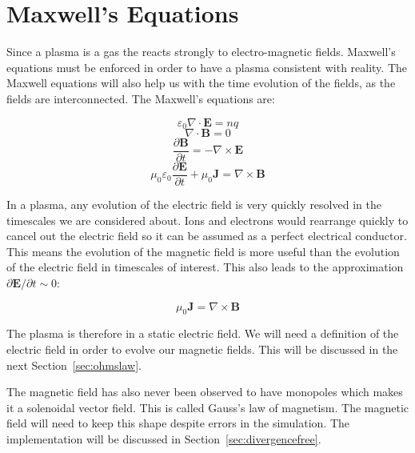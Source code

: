 \documentclass[12pt,upcase]{umlthesis}
\begin{document}
\section{Maxwell's Equations}

Since a plasma is a gas the reacts strongly to electro-magnetic fields. Maxwell's equations must be enforced in order to have a plasma consistent with reality. The Maxwell equations will also help us with the time evolution of the fields, as the fields are interconnected. The Maxwell's equations are:

\begin{equation}\label{eq:gausslaw}
	\varepsilon_0\nabla\cdot\textbf{E} = n q
\end{equation}
\begin{equation}\label{eq:maggausslaw}
	\nabla\cdot\textbf{B} = 0
\end{equation}
\begin{equation}\label{eq:lawofinduction}
	\frac{\partial\textbf{B}}{\partial t} = - \nabla\times\textbf{E}
\end{equation}
\begin{equation}\label{eq:ampereslaw}
	\mu_0\varepsilon_0\frac{\partial\textbf{E}}{\partial t} + \mu_0\textbf{J} = \nabla\times\textbf{B}
\end{equation}

In a plasma, any evolution of the electric field is very quickly resolved in the timescales we are considered about. Ions and electrons would rearrange quickly to cancel out the electric field so it can be assumed as a perfect electrical conductor. This means the evolution of the magnetic field is more useful than the evolution of the electric field in timescales of interest. This also leads to the approximation $\partial\textbf{E}/\partial t \sim 0$:

\begin{equation}\label{eq:ampereslawapprox}
	\mu_0\textbf{J} = \nabla\times\textbf{B}
\end{equation}

The plasma is therefore in a static electric field. We will need a definition of the electric field in order to evolve our magnetic fields. This will be discussed in the next Section~\ref{sec:ohmslaw}.

The magnetic field has also never been observed to have monopoles which makes it a solenoidal vector field. This is called Gauss's law of magnetism. The magnetic field will need to keep this shape despite errors in the simulation. The implementation will be discussed in Section~\ref{sec:divergencefree}.
\end{document}
